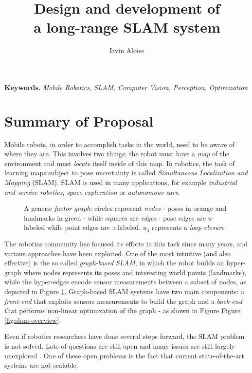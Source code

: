 \documentclass[10pt,a4paper, notitlepage]{report}
\title{Design and development of \\ a long-range SLAM system}
\author{Irvin Aloise}
\begin{document}
\maketitle


\textbf{Keywords.} \textit{Mobile Robotics, SLAM, Computer Vision, Perception, Optimization}


\section*{Summary of Proposal}
Mobile robots, in order to accomplish tasks in the world, need to be aware of where they are. This involves two things: the robot must have a \textit{map} of the environment and must \textit{locate} itself inside of this map. In robotics, the task of learning maps subject to pose uncertainty is called \textit{Simultaneous Localization and Mapping} (SLAM). SLAM is used in many applications, for example \textit{industrial and service robotics}, \textit{space exploration} or \textit{autonomous cars}. 

\begin{figure}[h]
    \centering
    \resizebox{0.8\textwidth}{!}{}
    \caption{A generic \textit{factor graph}: circles represent \textit{nodes} - poses in orange and landmarks in green -  while squares are \textit{edges} - pose edges are $u$-labeled while point edges are $z$-labeled. $u_4$ represents a \textit{loop-closure}}
    \label{fig:graph}
\end{figure}

The robotics community has focused its efforts in this task since many years, and various approaches have been exploited. One of the most intuitive (and also effective) is the so called \textit{graph-based SLAM}\cite{lu1997globally}, in which the robot builds an hyper-graph where nodes represents its poses and interesting world points (landmarks), while the hyper-edges encode sensor measurements between a subset of nodes, as depicted in Figure \ref{fig:graph}. Graph-based SLAM systems have two main components: a \textit{front-end} that exploits sensors measurements to build the graph and a \textit{back-end} that performs non-linear optimization of the graph - as shown in Figure Figure \ref{fig:slam-overview}. 

Even if robotics researchers have done several steps forward, the SLAM problem is not solved. Lots of questions are still open and many issues are still largely unexplored \cite{carlone2016slam-survey}. One of these open problems is the fact that current state-of-the-art systems are not scalable. 
\end{document}
